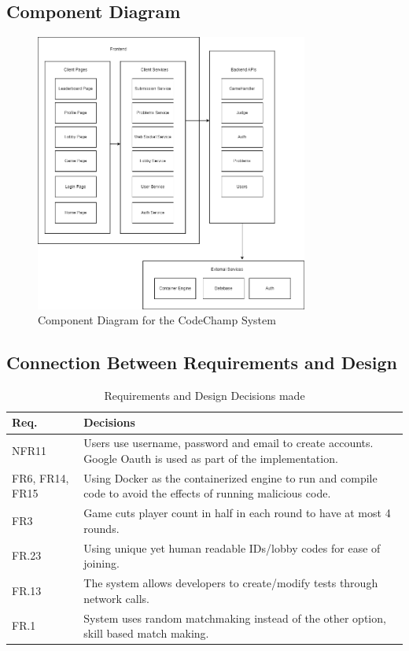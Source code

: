 \documentclass[12pt, titlepage]{article}
\begin{document}
\subsection{Component Diagram}

\begin{figure}[H]
\centering
\includegraphics[width=0.8\textwidth]{Design/SystDesign/ComponentDiagram.png}
\caption{Component Diagram for the CodeChamp System}
\end{figure}

\subsection{Connection Between Requirements and Design} \label{SecConnection}

\begin{table}[H]
\centering 
\begin{tabular}{p{} p{}}
\toprule
\textbf{Req.} & \textbf{Decisions}\\
\midrule
NFR11 & Users use username, password and email to create accounts. Google Oauth is used as part of the implementation.\\ 
FR6, FR14, FR15 & Using Docker as the containerized engine to run and compile code to avoid the effects of running malicious code.\\
FR3 & Game cuts player count in half in each round to have at most 4 rounds.\\
FR.23 & Using unique yet human readable IDs/lobby codes for ease of joining. \\
FR.13 & The system allows developers to create/modify tests through network calls. \\
FR.1 & System uses random matchmaking instead of the other option, skill based match making. \\
\hline
\end{tabular}
\caption{Requirements and Design Decisions made}
\label{TblRT2}
\end{table}
\end{document}
